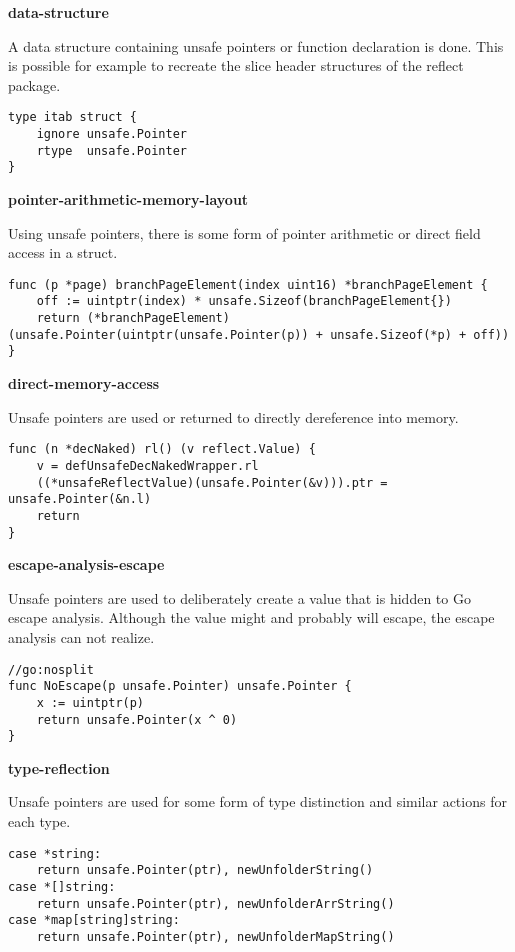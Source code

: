 \textbf{data-structure}

A data structure containing unsafe pointers or function declaration is done.
This is possible for example to recreate the slice header structures of the reflect package.

\begin{lstlisting}[language=Golang, label=lst:survey-small-classexample-data-structure, caption=Usage class example: data-structure]
type itab struct {
    ignore unsafe.Pointer
    rtype  unsafe.Pointer
}
\end{lstlisting}


\textbf{pointer-arithmetic-memory-layout}

Using unsafe pointers, there is some form of pointer arithmetic or direct field access in a struct.

\begin{lstlisting}[language=Golang, label=lst:survey-small-classexample-pointer-arithmetic-memory-layout, caption=Usage class example: pointer-arithmetic-memory-layout]
func (p *page) branchPageElement(index uint16) *branchPageElement {
    off := uintptr(index) * unsafe.Sizeof(branchPageElement{})
    return (*branchPageElement)(unsafe.Pointer(uintptr(unsafe.Pointer(p)) + unsafe.Sizeof(*p) + off))
}
\end{lstlisting}


\textbf{direct-memory-access}

Unsafe pointers are used or returned to directly dereference into memory.

\begin{lstlisting}[language=Golang, label=lst:survey-small-classexample-direct-memory-access, caption=Usage class example: direct-memory-access]
func (n *decNaked) rl() (v reflect.Value) {
    v = defUnsafeDecNakedWrapper.rl
    ((*unsafeReflectValue)(unsafe.Pointer(&v))).ptr = unsafe.Pointer(&n.l)
    return
}
\end{lstlisting}


\textbf{escape-analysis-escape}

Unsafe pointers are used to deliberately create a value that is hidden to Go escape analysis.
Although the value might and probably will escape, the escape analysis can not realize.

\begin{lstlisting}[language=Golang, label=lst:survey-small-classexample-escape-analysis-escape, caption=Usage class example: escape-analysis-escape]
//go:nosplit
func NoEscape(p unsafe.Pointer) unsafe.Pointer {
    x := uintptr(p)
    return unsafe.Pointer(x ^ 0)
}
\end{lstlisting}


\textbf{type-reflection}

Unsafe pointers are used for some form of type distinction and similar actions for each type.

\begin{lstlisting}[language=Golang, label=lst:survey-small-classexample-type-reflection, caption=Usage class example: type-reflection]
case *string:
    return unsafe.Pointer(ptr), newUnfolderString()
case *[]string:
    return unsafe.Pointer(ptr), newUnfolderArrString()
case *map[string]string:
    return unsafe.Pointer(ptr), newUnfolderMapString()
\end{lstlisting}
